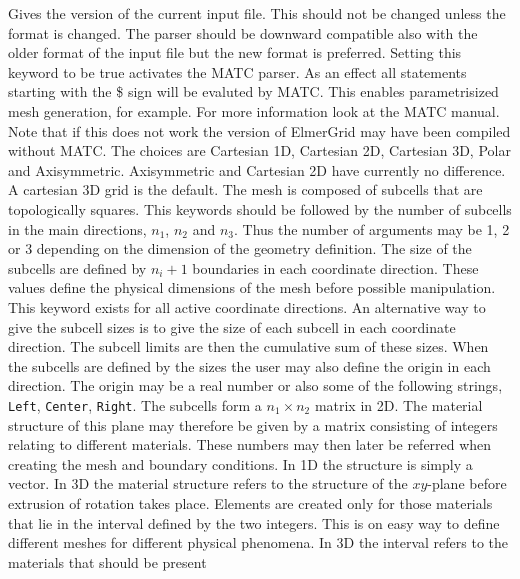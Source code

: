 \sifbegin
{}
Gives the version of the current input file. This should not be changed unless
the format is changed. The parser should be downward compatible also with the older
format of the input file but the new format is preferred.
%
Setting this keyword to be true activates the MATC parser. As an effect all statements 
starting with the \$ sign will be evaluted by MATC. This enables parametrisized mesh generation,
for example. For more information look at the MATC manual. Note that if this does not work the 
version of ElmerGrid may have been compiled without MATC. 
%
The choices are Cartesian 1D, Cartesian 2D, Cartesian 3D, Polar and 
Axisymmetric. Axisymmetric and Cartesian 2D have currently
no difference.
A cartesian 3D grid is the default.
%
The mesh is composed of subcells that are 
topologically squares. 
This keywords should be followed by the 
number of subcells in the main directions,
$n_1$, $n_2$ and $n_3$.
Thus the number of 
arguments may be 1, 2 or 3 depending on the dimension of the geometry 
definition. 
The size of the subcells are defined by $n_i+1$ boundaries
in each coordinate direction. These values define the physical 
dimensions of the mesh before possible manipulation. 
This keyword exists for all active coordinate directions.  
%
An alternative way to give the subcell sizes is to give the size of 
each subcell in each coordinate direction. 
The subcell limits are then the cumulative sum of these sizes.
%
When the subcells are defined by the sizes the user may also define the origin 
in each direction. The origin may be a real number or also some of the following 
strings, \texttt{Left}, \texttt{Center}, \texttt{Right}.
%
The subcells form a $n_1 \times n_2$ matrix in 2D. 
The material structure of this plane may therefore be given by a matrix 
consisting of integers relating to different materials.
These numbers may then later be referred
when creating the mesh and boundary conditions.
In 1D the structure is simply a vector.
In 3D the material structure refers to the structure of the 
$xy$-plane before extrusion of rotation takes place. 
%
Elements are created only for those materials that 
lie in the interval defined by the two integers.
This is on easy way to define different meshes for different physical
phenomena.
In 3D the interval refers to the materials that should be present
